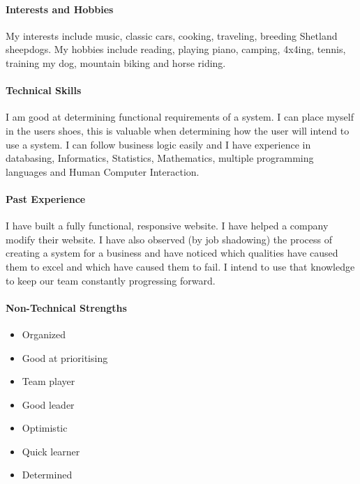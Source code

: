 \documentclass[english]{article}
\begin{document}
		\paragraph{Interests and Hobbies}
		My interests include music, classic cars, cooking, traveling, breeding Shetland sheepdogs. My hobbies include reading, playing piano, camping, 4x4ing, tennis, training my dog, mountain biking and horse riding.
		
		\paragraph{Technical Skills}
		I am good at determining functional requirements of a system. I can place myself in the users shoes, this is valuable when determining how the user will intend to use a system. I can follow business logic easily and I have experience in databasing, Informatics, Statistics, Mathematics, multiple programming languages and Human Computer Interaction.
		
		\paragraph{Past Experience}
		I have built a fully functional, responsive website. I have helped a company modify their website. I have also observed (by job shadowing) the process of creating a system for a business and have noticed which qualities have caused them to excel and which have caused them to fail. I intend to use that knowledge to keep our team constantly progressing forward.
		
		\paragraph{Non-Technical Strengths}
		\begin{itemize}
			\setlength\itemsep{0.2em}
			\item Organized
			\item Good at prioritising 
			\item Team player
			\item Good leader
			\item Optimistic
			\item Quick learner
			\item Determined
		\end{itemize}
		
\end{document}
